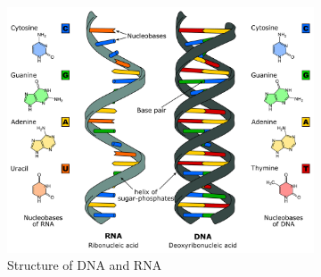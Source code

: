 \documentclass[12pt,a4paper,titlepage,openany]{report}
\begin{document}
\begin{figure}[h]
	\centering
	\begin{subfigure}{0.63\linewidth}
		\includegraphics[width=\linewidth]{Difference_DNA_RNA-EN}
		\caption{Structure of DNA and RNA}
		\label{fig:DNA and RNA}
	\end{subfigure}
	~
	\begin{subfigure}{0.34\linewidth}

\end{subfigure}
\end{figure}
\end{document}
